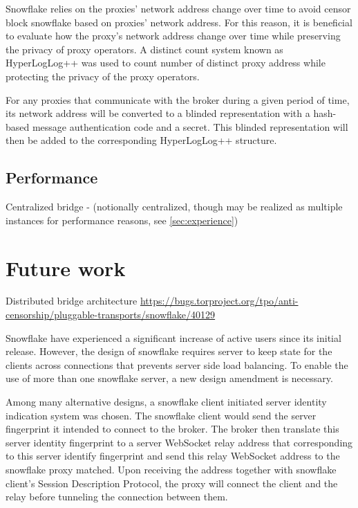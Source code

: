 \documentclass[letterpaper,twocolumn]{article}
\begin{document}
Snowflake relies on the proxies' network address change over time to avoid censor block snowflake based on proxies' network address. For this reason, it is beneficial to evaluate how the proxy's network address change over time while preserving the privacy of proxy operators. A distinct count system known as HyperLogLog++ was used to count number of distinct proxy address while protecting the privacy of the proxy operators.

For any proxies that communicate with the broker during a given period of time, its network address will be converted to a blinded representation with a hash-based message authentication code and a secret. This blinded representation will then be added to the corresponding HyperLogLog++ structure.

\subsection{Performance}
\label{sec:performance}


Centralized bridge
- (notionally centralized, though may be realized as multiple instances for performance reasons, see \autoref{sec:experience})

\section{Future work}
\label{sec:future}


Distributed bridge architecture
\url{https://bugs.torproject.org/tpo/anti-censorship/pluggable-transports/snowflake/40129}

Snowflake have experienced a significant increase of active users since its initial release. However, the design of snowflake requires server to keep state for the clients across connections that prevents server side load balancing. To enable the use of more than one snowflake server, a new design amendment is necessary.

Among many alternative designs, a snowflake client initiated server identity indication system was chosen. The snowflake client would send the server fingerprint it intended to connect to the broker. The broker then translate this server identity fingerprint to a server WebSocket relay address that corresponding to this server identify fingerprint and send this relay WebSocket address to the snowflake proxy matched. Upon receiving the address together with snowflake client's Session Description Protocol, the proxy will connect the client and the relay before tunneling the connection between them.
\end{document}

